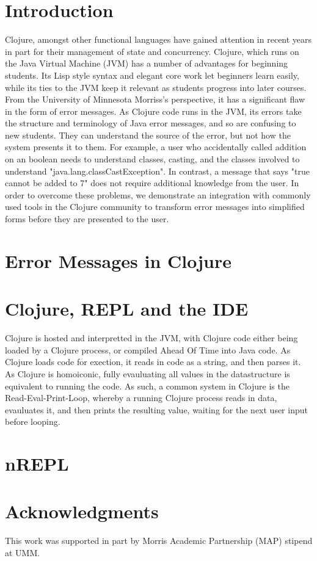 \documentclass[12pt]{article}
\begin{document}
\section{Introduction}
Clojure, amongst other functional languages have gained attention in recent years
in part for their management of state and concurrency.
Clojure, which runs on the Java Virtual Machine (JVM) has a number of advantages for beginning students.
Its Lisp style syntax and elegant core work let beginners learn easily, while
its ties to the JVM keep it relevant as students progress into later courses.
From the University of Minnesota Morriss's perspective, it has a significant flaw in the form of error messages.
As Clojure code runs in the JVM, its errors take the structure and terminology of Java error messages,
and so are confusing to new students. They can understand the source of the error,
but not how the system presents it to them.
For example, a user who accidentally called addition on an boolean needs
 to understand classes, casting, and the classes involved to understand "java.lang.classCastException".
 In contrast, a message that says "true cannot be added to 7" does not require additional knowledge from the user.
 In order to overcome these problems,
  we demonstrate an integration with commonly used tools in the Clojure community
 to transform error messages into simplified forms before they are presented to the user.

\cite{Hickey:2008}

\section{Error Messages in Clojure}


\section{Clojure, REPL and the IDE}
Clojure is hosted and interpretted in the JVM, with Clojure code either being
loaded by a Clojure process, or compiled Ahead Of Time into Java code.
As Clojure loads code for exection, it reads in code as a string,
and then parses it. As Clojure is homoiconic, fully evauluating all values in the datastructure
is equivalent to running the code.
As such, a common system in Clojure is the Read-Eval-Print-Loop, whereby a running Clojure
process reads in data, evauluates it, and then prints the resulting value, waiting for the next user input before looping.


\section{nREPL}

\section{Acknowledgments}
This work was supported in part by Morris Academic Partnership (MAP) stipend at UMM.




\end{document}
